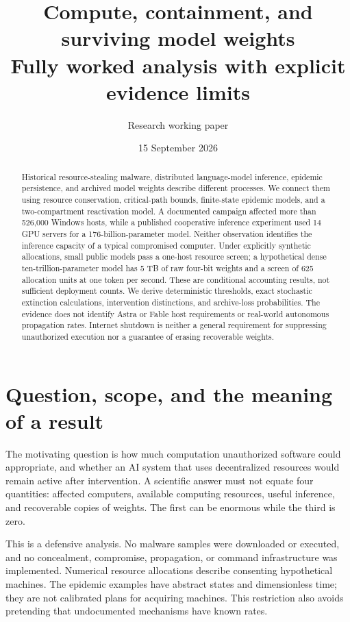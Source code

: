 \documentclass[11pt]{article}
\title{Compute, containment, and surviving model weights\\\large Fully worked analysis with explicit evidence limits}
\author{Research working paper}
\date{15 September 2026}
\begin{document}
\maketitle
\begin{abstract}
Historical resource-stealing malware, distributed language-model inference, epidemic persistence, and archived model weights describe different processes. We connect them using resource conservation, critical-path bounds, finite-state epidemic models, and a two-compartment reactivation model. A documented campaign affected more than 526,000 Windows hosts, while a published cooperative inference experiment used 14 GPU servers for a 176-billion-parameter model. Neither observation identifies the inference capacity of a typical compromised computer. Under explicitly synthetic allocations, small public models pass a one-host resource screen; a hypothetical dense ten-trillion-parameter model has 5 TB of raw four-bit weights and a screen of 625 allocation units at one token per second. These are conditional accounting results, not sufficient deployment counts. We derive deterministic thresholds, exact stochastic extinction calculations, intervention distinctions, and archive-loss probabilities. The evidence does not identify Astra or Fable host requirements or real-world autonomous propagation rates. Internet shutdown is neither a general requirement for suppressing unauthorized execution nor a guarantee of erasing recoverable weights.
\end{abstract}

\section{Question, scope, and the meaning of a result}
The motivating question is how much computation unauthorized software could appropriate, and whether an AI system that uses decentralized resources would remain active after intervention. A scientific answer must not equate four quantities: affected computers, available computing resources, useful inference, and recoverable copies of weights. The first can be enormous while the third is zero.

This is a defensive analysis. No malware samples were downloaded or executed, and no concealment, compromise, propagation, or command infrastructure was implemented. Numerical resource allocations describe consenting hypothetical machines. The epidemic examples have abstract states and dimensionless time; they are not calibrated plans for acquiring machines. This restriction also avoids pretending that undocumented mechanisms have known rates.
\end{document}

